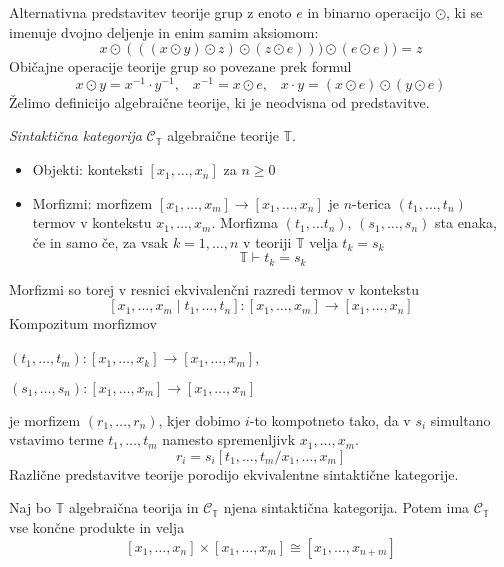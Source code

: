 \documentclass[../kategoricna_logika.tex]{subfiles}
\begin{document}
%
Alternativna predstavitev teorije grup z enoto $e$ in binarno operacijo $\odot$, ki se imenuje dvojno deljenje in enim samim aksiomom:
$$x \odot (((x \odot y ) \odot z ) \odot ( z \odot e))) \odot (e \odot e) ) = z$$
Običajne operacije teorije grup so povezane prek formul
$$x \odot y = x^{-1} \cdot y^{-1} \text{,} \quad x^{-1} = x \odot e \text{,} \quad x \cdot y = (x \odot e) \odot (y \odot e)$$
%
Želimo definicijo algebraične teorije, ki je neodvisna od predstavitve.
%
\begin{definicija}
\emph{Sintaktična kategorija} $\mathcal{C}_\mathbb{T}$ algebraične teorije $\mathbb{T}$.
%
\begin{itemize}
\item Objekti: konteksti $[x_1, \ldots, x_n]$ za $n \geq 0$
%
\item Morfizmi: morfizem $[x_1, \ldots, x_m] \to [x_1, \ldots, x_n]$ je $n$-terica $(t_1, \ldots, t_n)$ termov v kontekstu $x_1, \ldots, x_m$. Morfizma $(t_1, \ldots t_n)$, $(s_1, \ldots, s_n)$ sta enaka, če in samo če, za vsak $k = 1, \ldots, n$ v teoriji $\mathbb{T}$ velja $t_k = s_k$
$$\mathbb{T} \vdash t_k = s_k$$
\end{itemize}
\end{definicija}
%
Morfizmi so torej v resnici ekvivalenčni razredi termov v kontekstu
$$[x_1, \ldots, x_m \mid t_1, \ldots, t_n] : [x_1, \ldots, x_m] \to [x_1, \ldots, x_n]$$
%
Kompozitum morfizmov
\begin{center}
\begin{description}
\item $(t_1, \ldots, t_m) : [x_1, \ldots, x_k] \to [x_1, \ldots, x_m]$,
\item $(s_1, \ldots, s_n) : [x_1, \ldots, x_m] \to [x_1, \ldots, x_n]$
\end{description}
\end{center}
je morfizem $(r_1, \ldots, r_n)$, kjer dobimo $i$-to kompotneto tako, da v $s_i$ simultano vstavimo terme $t_1, \ldots, t_m$ namesto spremenljivk $x_1, \ldots, x_m$.
$$r_i = s_i[t_1, \ldots, t_m / x_1, \ldots, x_m]$$
%
Različne predstavitve teorije porodijo ekvivalentne sintaktične kategorije.
%
\begin{lema}
Naj bo $\mathbb{T}$ algebraična teorija in $\mathcal{C}_\mathbb{T}$ njena sintaktična kategorija. Potem ima $\mathcal{C}_\mathbb{T}$ vse končne produkte in velja
$$[x_1, \ldots, x_n] \times [x_1, \ldots, x_m] \cong [x_1, \ldots, x_{n+m}]$$
\end{lema}
%
%
\end{document}
